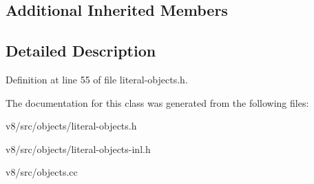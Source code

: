 \subsection*{Additional Inherited Members}


\subsection{Detailed Description}


Definition at line 55 of file literal-\/objects.\+h.



The documentation for this class was generated from the following files\+:\begin{DoxyCompactItemize}
\item 
v8/src/objects/literal-\/objects.\+h\item 
v8/src/objects/literal-\/objects-\/inl.\+h\item 
v8/src/objects.\+cc\end{DoxyCompactItemize}
